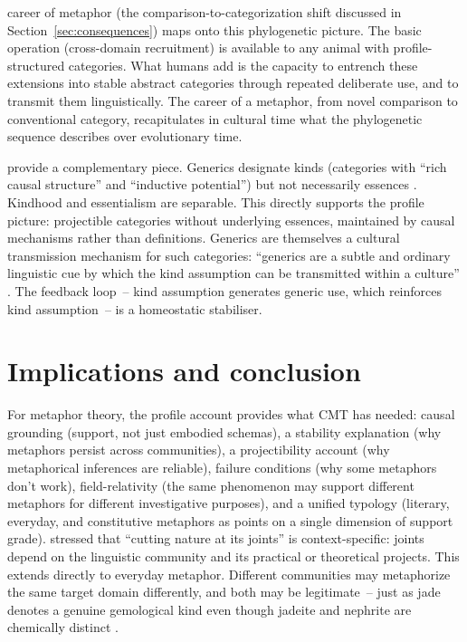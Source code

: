 \documentclass[12pt]{article}
\begin{document}
 career of metaphor (the comparison-to-categorization shift discussed in Section~\ref{sec:consequences}) maps onto this phylogenetic picture. The basic operation (cross-domain recruitment) is available to any animal with profile-structured categories. What humans add is the capacity to entrench these extensions into stable abstract categories through repeated deliberate use, and to transmit them linguistically. The career of a metaphor, from novel comparison to conventional category, recapitulates in cultural time what the phylogenetic sequence describes over evolutionary time.

\textcite{noyes2019} provide a complementary piece. Generics designate kinds (categories with \enquote{rich causal structure} and \enquote{inductive potential}) but not necessarily essences \citep[2]{noyes2019}. Kindhood and essentialism are separable. This directly supports the profile picture: projectible categories without underlying essences, maintained by causal mechanisms rather than definitions. Generics are themselves a cultural transmission mechanism for such categories: \enquote{generics are a subtle and ordinary linguistic cue by which the kind assumption can be transmitted within a culture} \citep[5]{noyes2019}. The feedback loop~-- kind assumption generates generic use, which reinforces kind assumption~-- is a homeostatic stabiliser.

\section{Implications and conclusion}
\label{sec:conclusion}

For metaphor theory, the profile account provides what CMT has needed: causal grounding (support, not just embodied schemas), a stability explanation (why metaphors persist across communities), a projectibility account (why metaphorical inferences are reliable), failure conditions (why some metaphors don't work), field-relativity (the same phenomenon may support different metaphors for different investigative purposes), and a unified typology (literary, everyday, and constitutive metaphors as points on a single dimension of support grade). \textcite[532]{boyd1993metaphor} stressed that \enquote{cutting nature at its joints} is context-specific: joints depend on the linguistic community and its practical or theoretical projects. This extends directly to everyday metaphor. Different communities may metaphorize the same target domain differently, and both may be legitimate~-- just as jade denotes a genuine gemological kind even though jadeite and nephrite are chemically distinct \citep[396]{boyd1979}.
\end{document}
